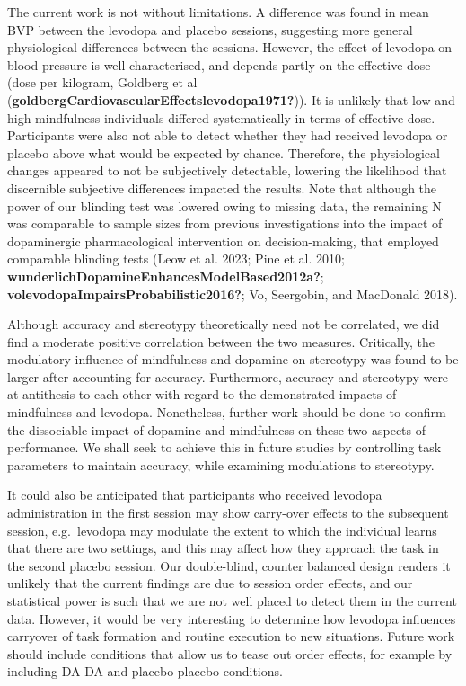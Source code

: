 \documentclass{article}
\begin{document}
The current work is not without limitations. A difference was found in
mean BVP between the levodopa and placebo sessions, suggesting more
general physiological differences between the sessions. However, the
effect of levodopa on blood-pressure is well characterised, and depends
partly on the effective dose (dose per kilogram, Goldberg et al
(\textbf{goldbergCardiovascularEffectslevodopa1971?})). It is unlikely
that low and high mindfulness individuals differed systematically in
terms of effective dose. Participants were also not able to detect
whether they had received levodopa or placebo above what would be
expected by chance. Therefore, the physiological changes appeared to not
be subjectively detectable, lowering the likelihood that discernible
subjective differences impacted the results. Note that although the
power of our blinding test was lowered owing to missing data, the
remaining N was comparable to sample sizes from previous investigations
into the impact of dopaminergic pharmacological intervention on
decision-making, that employed comparable blinding tests (Leow et al.
2023; Pine et al. 2010;
\textbf{wunderlichDopamineEnhancesModelBased2012a?};
\textbf{volevodopaImpairsProbabilistic2016?}; Vo, Seergobin, and
MacDonald 2018).

Although accuracy and stereotypy theoretically need not be correlated,
we did find a moderate positive correlation between the two measures.
Critically, the modulatory influence of mindfulness and dopamine on
stereotypy was found to be larger after accounting for accuracy.
Furthermore, accuracy and stereotypy were at antithesis to each other
with regard to the demonstrated impacts of mindfulness and levodopa.
Nonetheless, further work should be done to confirm the dissociable
impact of dopamine and mindfulness on these two aspects of performance.
We shall seek to achieve this in future studies by controlling task
parameters to maintain accuracy, while examining modulations to
stereotypy.

It could also be anticipated that participants who received levodopa
administration in the first session may show carry-over effects to the
subsequent session, e.g.~levodopa may modulate the extent to which the
individual learns that there are two settings, and this may affect how
they approach the task in the second placebo session. Our double-blind,
counter balanced design renders it unlikely that the current findings
are due to session order effects, and our statistical power is such that
we are not well placed to detect them in the current data. However, it
would be very interesting to determine how levodopa influences carryover
of task formation and routine execution to new situations. Future work
should include conditions that allow us to tease out order effects, for
example by including DA-DA and placebo-placebo conditions.
\end{document}
